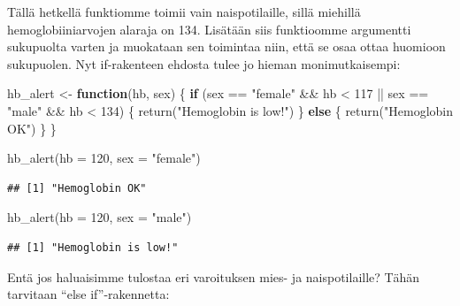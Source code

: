 \documentclass[
]{book}
\newenvironment{Shaded}{\begin{snugshade}}{\end{snugshade}}
\newcommand{\AttributeTok}[1]{\textcolor[rgb]{0.77,0.63,0.00}{#1}}
\newcommand{\ControlFlowTok}[1]{\textcolor[rgb]{0.13,0.29,0.53}{\textbf{#1}}}
\newcommand{\DecValTok}[1]{\textcolor[rgb]{0.00,0.00,0.81}{#1}}
\newcommand{\FunctionTok}[1]{\textcolor[rgb]{0.00,0.00,0.00}{#1}}
\newcommand{\NormalTok}[1]{#1}
\newcommand{\OtherTok}[1]{\textcolor[rgb]{0.56,0.35,0.01}{#1}}
\newcommand{\SpecialCharTok}[1]{\textcolor[rgb]{0.00,0.00,0.00}{#1}}
\newcommand{\StringTok}[1]{\textcolor[rgb]{0.31,0.60,0.02}{#1}}
\begin{document}
Tällä hetkellä funktiomme toimii vain naispotilaille, sillä miehillä hemoglobiiniarvojen alaraja on 134. Lisätään siis funktioomme argumentti sukupuolta varten ja muokataan sen toimintaa niin, että se osaa ottaa huomioon sukupuolen. Nyt if-rakenteen ehdosta tulee jo hieman monimutkaisempi:

\begin{Shaded}
\begin{Highlighting}[]
\NormalTok{hb\_alert }\OtherTok{\textless{}{-}} \ControlFlowTok{function}\NormalTok{(hb, sex) \{}
  \ControlFlowTok{if}\NormalTok{ (sex }\SpecialCharTok{==} \StringTok{"female"} \SpecialCharTok{\&\&}\NormalTok{ hb }\SpecialCharTok{\textless{}} \DecValTok{117} \SpecialCharTok{||}\NormalTok{ sex }\SpecialCharTok{==} \StringTok{"male"} \SpecialCharTok{\&\&}\NormalTok{ hb }\SpecialCharTok{\textless{}} \DecValTok{134}\NormalTok{) \{}
    \FunctionTok{return}\NormalTok{(}\StringTok{"Hemoglobin is low!"}\NormalTok{)}
\NormalTok{  \} }\ControlFlowTok{else}\NormalTok{ \{}
    \FunctionTok{return}\NormalTok{(}\StringTok{"Hemoglobin OK"}\NormalTok{)}
\NormalTok{  \}}
\NormalTok{\}}

\FunctionTok{hb\_alert}\NormalTok{(}\AttributeTok{hb =} \DecValTok{120}\NormalTok{, }\AttributeTok{sex =} \StringTok{"female"}\NormalTok{)}
\end{Highlighting}
\end{Shaded}

\begin{verbatim}
## [1] "Hemoglobin OK"
\end{verbatim}

\begin{Shaded}
\begin{Highlighting}[]
\FunctionTok{hb\_alert}\NormalTok{(}\AttributeTok{hb =} \DecValTok{120}\NormalTok{, }\AttributeTok{sex =} \StringTok{"male"}\NormalTok{)}
\end{Highlighting}
\end{Shaded}

\begin{verbatim}
## [1] "Hemoglobin is low!"
\end{verbatim}

Entä jos haluaisimme tulostaa eri varoituksen mies- ja naispotilaille? Tähän tarvitaan ``else if''-rakennetta:
\end{document}
